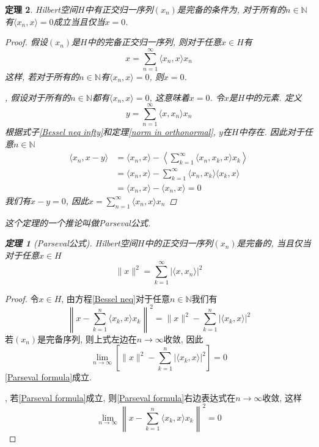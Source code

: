 \documentclass[a4paper,11pt]{book}
\newtheorem{theorem}{\hspace{2em}定理}[section]
\newtheorem{proof}{证明}[section]
\begin{document}
\begin{theorem}
  Hilbert空间$H$中有正交归一序列$(x_n)$是完备的条件为, 对于所有的$n\in\mathbb{N}$有$\langle x_n,x\rangle=0$成立当且仅当$x=0$.
  \begin{proof}
    假设$(x_n)$是$H$中的完备正交归一序列, 则对于任意$x\in H$有
    \begin{equation*}
      x=\sum_{n=1}^{\infty}\langle x_n,x\rangle x_n
    \end{equation*}
    这样, 若对于所有的$n\in \mathbb{N}$有$\langle x_n,x\rangle=0$, 则$x=0$.

    , 假设对于所有的$n\in \mathbb{N}$都有$\langle x_n,x\rangle=0$, 这意味着$x=0$. 令$x$是$H$中的元素. 定义
    \begin{equation*}
      y=\sum_{n=1}^{\infty}\langle x,x_n\rangle x_n
    \end{equation*}
    根据式子\eqref{Bessel neq infty}和定理\ref{norm in orthonormal}, $y$在$H$中存在. 因此对于任意$n\in \mathbb{N}$
    \begin{equation*}
      \begin{split}
         \langle x_n,x-y\rangle & =\langle x_n,x\rangle-\left\langle\sum_{k=1}^{\infty}\langle x_n,x_k,x\rangle x_k\right\rangle \\
           & =\langle x_n,x\rangle-\sum_{k=1}^{\infty}\langle x_n,x_k\rangle\langle x_k,x\rangle \\
           & =\langle x_n,x\rangle-\langle x_n,x\rangle=0
      \end{split}
    \end{equation*}
    我们有$x-y=0$, 因此$x=\sum_{n=1}^{\infty}\langle x_n,x\rangle x_n$
  \end{proof}
  这个定理的一个推论叫做Parseval公式.
  \begin{theorem}[Parseval公式]
    Hilbert空间$H$中的正交归一序列$(x_n)$是完备的, 当且仅当对于任意$x\in H$
    \begin{equation}\label{Parseval formula}
      \|x\|^2=\sum_{k=1}^{\infty}|\langle x,x_n\rangle|^2
    \end{equation}
  \end{theorem}
\end{theorem}
\begin{proof}
  令$x\in H$, 由方程\eqref{Bessel neq}对于任意$n\in\mathbb{N}$我们有
  \begin{equation*}
    \left\|x-\sum_{k=1}^{n}\langle x_k,x\rangle x_k\right\|^2=\|x\|^2-\sum_{k=1}^{n}|\langle x_k,x\rangle|^2
  \end{equation*}
  若$(x_n)$是完备序列, 则上式左边在$n\to \infty$收敛, 因此
  \begin{equation*}
    \lim_{n\to\infty}\left[\|x\|^2-\sum_{k=1}^{n}|\langle x_k,x\rangle|^2\right]=0
  \end{equation*}
  \eqref{Parseval formula}成立.

  , 若\eqref{Parseval formula}成立, 则\eqref{Parseval formula}右边表达式在$n\to\infty$收敛, 这样
  \begin{equation*}
    \lim_{n\to\infty}\left\|x-\sum_{k=1}^{n}\langle x_k,x\rangle x_k\right\|^2=0
  \end{equation*}
\end{proof}
\end{document}
